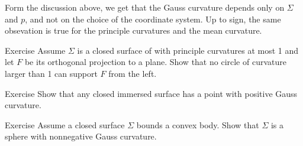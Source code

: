 Form the discussion above, 
we get that the Gauss curvature depends only on $\Sigma$ and $p$,
and not on the choice of the coordinate system.
Up to sign, the same obsevation is true for the principle curvatures and the mean curvature. 


\begin{thm}{Exercise}\label{ex:projection}
Assume $\Sigma$ is a closed surface of with principle curvatures at most 1
and let $F$ be its orthogonal projection to a plane.
Show that no circle of curvature larger than 1 can support $F$ from the left. %
\end{thm}

\begin{thm}{Exercise}
Show that any closed immersed surface has a point with positive Gauss curvature.
\end{thm}

\begin{thm}{Exercise}
Assume a closed surface $\Sigma$ bounds a convex body.
Show that $\Sigma$ is a sphere with nonnegative Gauss curvature. 
\end{thm}






